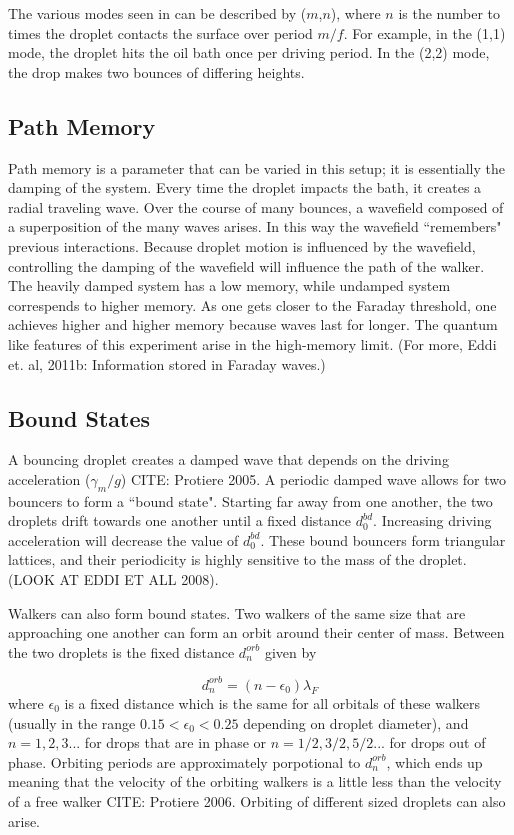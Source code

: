 The various modes seen in  can be described by ($m$,$n$), where $n$ is the number to times the droplet contacts the surface over period $m/f$. For example, in the (1,1) mode, the droplet hits the oil bath once per driving period. In the (2,2) mode, the drop makes two bounces of differing heights. 
	       
            \subsection{Path Memory}
                        
            Path memory is a parameter that can be varied in this setup; it is essentially the damping of the system. Every time the droplet impacts the bath, it creates a radial traveling wave. Over the course of many bounces, a wavefield composed of a superposition of the many waves arises. In this way the wavefield ``remembers" previous interactions. Because droplet motion is influenced by the wavefield, controlling the damping of the wavefield will influence the path of the walker. The heavily damped system has a low memory, while undamped system correspends to higher memory. As one gets closer to the Faraday threshold, one achieves higher and higher memory because waves last for longer. The quantum like features of this experiment arise in the high-memory limit. (For more, Eddi et. al, 2011b: Information stored in Faraday waves.) 

            \subsection{Bound States}
            A bouncing droplet creates a damped wave that depends on the driving acceleration (${\gamma_m}/ g$) CITE: Protiere 2005. A periodic damped wave allows for two bouncers to form a ``bound state".  Starting far away from one another, the two droplets drift towards one another until a fixed distance $d_{0}^{bd}$. Increasing driving acceleration will decrease the value of $d_{0}^{bd}$. These bound bouncers form triangular lattices, and their periodicity is highly sensitive to the mass of the droplet. (LOOK AT EDDI ET ALL 2008).
            
            Walkers can also form bound states. Two walkers of the same size that are approaching one another can form an orbit around their center of mass. Between the two droplets is the fixed distance $d_{n}^{orb}$ given by
            
\begin{equation} \label{orbital}
d_{n}^{orb} = (n - \epsilon_0)\lambda_F
\end{equation}         
where $\epsilon_0$ is a fixed distance which is the same for all orbitals of these walkers (usually in the range $0.15 < \epsilon_0 < 0.25$ depending on droplet diameter), and $n = 1,2,3$... for drops that are in phase or $n = 1/2, 3/2, 5/2$... for drops out of phase. Orbiting periods are approximately porpotional to $d_{n}^{orb}$, which ends up meaning that the velocity of the orbiting walkers is a little less than the velocity of a free walker CITE: Protiere 2006. Orbiting of different sized droplets can also arise.      

